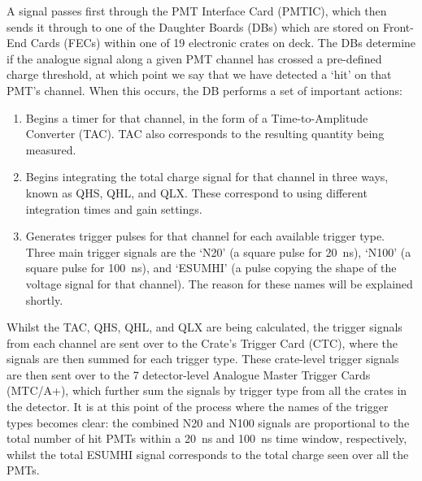 A signal passes first through the PMT Interface Card (PMTIC), which then sends it through to one of the Daughter Boards (DBs) which are stored on Front-End Cards (FECs) within one of 19 electronic crates on deck. The DBs determine if the analogue signal along a given PMT channel has crossed a pre-defined charge threshold, at which point we say that we have detected a `hit' on that PMT's channel. When this occurs, the DB performs a set of important actions:
\begin{enumerate}
    \item Begins a timer for that channel, in the form of a Time-to-Amplitude Converter (TAC). TAC also corresponds to the resulting quantity being measured.
    \item Begins integrating the total charge signal for that channel in three ways, known as QHS, QHL, and QLX. These correspond to using different integration times and gain settings.
    \item Generates trigger pulses for that channel for each available trigger type. Three main trigger signals are the `N20' (a square pulse for \SI{20}{\ns}), `N100' (a square pulse for \SI{100}{\ns}), and `ESUMHI' (a pulse copying the shape of the voltage signal for that channel). The reason for these names will be explained shortly.
\end{enumerate}

Whilst the TAC, QHS, QHL, and QLX are being calculated, the trigger signals from each channel are sent over to the Crate's Trigger Card (CTC), where the signals are then summed for each trigger type. These crate-level trigger signals are then sent over to the 7 detector-level Analogue Master Trigger Cards (MTC/A+), which further sum the signals by trigger type from all the crates in the detector. It is at this point of the process where the names of the trigger types becomes clear: the combined N20 and N100 signals are proportional to the total number of hit PMTs within a \SI{20}{\ns} and \SI{100}{\ns} time window, respectively, whilst the total ESUMHI signal corresponds to the total charge seen over all the PMTs.

